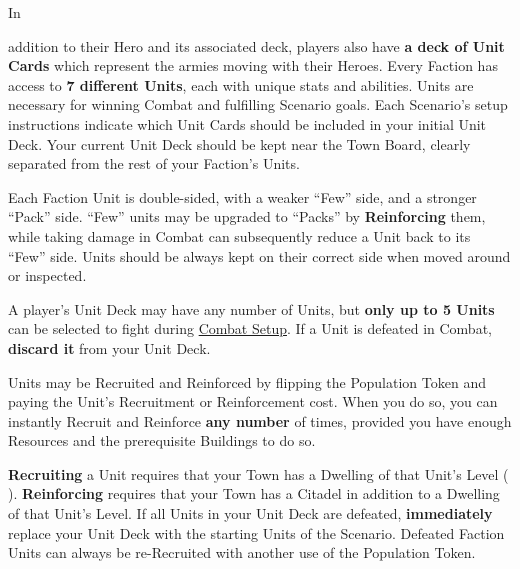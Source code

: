 
\begin{multicols*}{2}

\hypertarget{Units}{In} addition to their Hero and its associated deck, players also have \textbf{a deck of Unit Cards} which represent the armies moving with their Heroes.
Every Faction has access to \textbf{7 different Units}, each with unique stats and abilities.
Units are necessary for winning Combat and fulfilling Scenario goals.
Each Scenario's setup instructions indicate which Unit Cards should be included in your initial Unit Deck.
Your current Unit Deck should be kept near the Town Board, clearly separated from the rest of your Faction's Units.\par
Each Faction Unit is double-sided, with a weaker “Few” side, and a stronger “Pack” side.
“Few” units may be upgraded to “Packs” by \textbf{Reinforcing} them, while taking damage in Combat can subsequently reduce a Unit back to its “Few” side.
Units should be always kept on their correct side when moved around or inspected.\par
A player's Unit Deck may have any number of Units, but \textbf{only up to 5 Units} can be selected to fight during \hyperlink{Combatsetup}{Combat Setup}.
If a Unit is defeated in Combat, \textbf{discard it} from your Unit Deck.\par
Units may be Recruited and Reinforced by flipping the Population Token and paying the Unit's Recruitment  or Reinforcement  cost.
When you do so, you can instantly Recruit and Reinforce \textbf{any number} of times, provided you have enough Resources and the prerequisite Buildings to do so.\par

\textbf{Recruiting} a Unit requires that your Town has a Dwelling of that Unit's Level ( ).
\textbf{Reinforcing} requires that your Town has a Citadel in addition to a Dwelling of that Unit's Level.
If all Units in your Unit Deck are defeated, \textbf{immediately} replace your Unit Deck with the starting Units of the Scenario. Defeated Faction Units can always be re-Recruited with another use of the Population Token.\par

\par
\bigskip


\end{multicols*}
